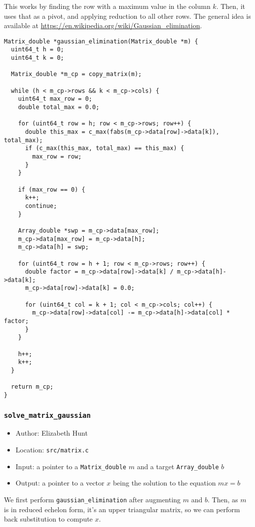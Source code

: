 \documentclass[11pt]{article}
\begin{document}
This works by finding the row with a maximum value in the column \(k\). Then, it uses that as a pivot, and
applying reduction to all other rows. The general idea is available at \url{https://en.wikipedia.org/wiki/Gaussian\_elimination}.

\begin{verbatim}
Matrix_double *gaussian_elimination(Matrix_double *m) {
  uint64_t h = 0;
  uint64_t k = 0;

  Matrix_double *m_cp = copy_matrix(m);

  while (h < m_cp->rows && k < m_cp->cols) {
    uint64_t max_row = 0;
    double total_max = 0.0;

    for (uint64_t row = h; row < m_cp->rows; row++) {
      double this_max = c_max(fabs(m_cp->data[row]->data[k]), total_max);
      if (c_max(this_max, total_max) == this_max) {
        max_row = row;
      }
    }

    if (max_row == 0) {
      k++;
      continue;
    }

    Array_double *swp = m_cp->data[max_row];
    m_cp->data[max_row] = m_cp->data[h];
    m_cp->data[h] = swp;

    for (uint64_t row = h + 1; row < m_cp->rows; row++) {
      double factor = m_cp->data[row]->data[k] / m_cp->data[h]->data[k];
      m_cp->data[row]->data[k] = 0.0;

      for (uint64_t col = k + 1; col < m_cp->cols; col++) {
        m_cp->data[row]->data[col] -= m_cp->data[h]->data[col] * factor;
      }
    }

    h++;
    k++;
  }

  return m_cp;
}
\end{verbatim}

\subsubsection{\texttt{solve\_matrix\_gaussian}}
\label{sec:orgb8fc210}
\begin{itemize}
\item Author: Elizabeth Hunt
\item Location: \texttt{src/matrix.c}
\item Input: a pointer to a \texttt{Matrix\_double} \(m\) and a target \texttt{Array\_double} \(b\)
\item Output: a pointer to a vector \(x\) being the solution to the equation \(mx = b\)
\end{itemize}

We first perform \texttt{gaussian\_elimination} after augmenting \(m\) and \(b\). Then, as \(m\) is in reduced echelon form, it's an upper
triangular matrix, so we can perform back substitution to compute \(x\).
\end{document}

